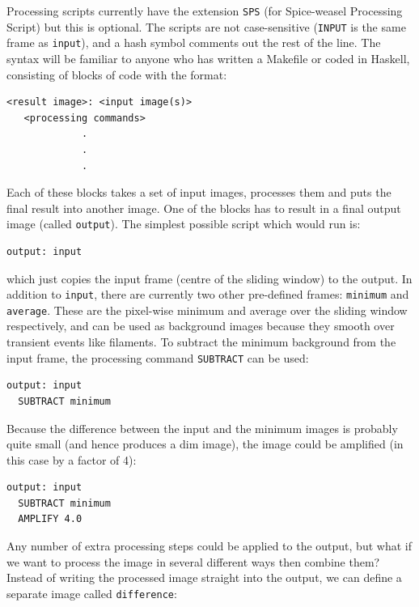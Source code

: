 \documentclass[12pt, a4paper]{article}
\begin{document}
Processing scripts currently have the extension \texttt{SPS} (for Spice-weasel Processing
Script) but this is optional. The scripts are not case-sensitive (\texttt{INPUT}
is the same frame as \texttt{input}), and a hash symbol comments out the rest of the line.
The syntax will be familiar to anyone who has written a Makefile
or coded in Haskell, consisting of blocks of code with the format:

\begin{verbatim}
<result image>: <input image(s)>
   <processing commands>
             .
             .
             .
\end{verbatim} 

\noindent Each of these blocks takes a set of input images, processes them and 
puts the final result into another image.
One of the blocks has to result in a final output image (called \texttt{output}).
The simplest possible script which would run is:

\begin{verbatim}
output: input
\end{verbatim}

\noindent which just copies the input frame (centre of the sliding window) to the output.
In addition to \texttt{input}, there are currently two other pre-defined frames:
\texttt{minimum} and \texttt{average}. These are the pixel-wise minimum and average over the
sliding window respectively, and can be used as background images because they smooth
over transient events like filaments.
To subtract the minimum background from the input frame, the processing command
\texttt{SUBTRACT} can be used:

\begin{verbatim}
output: input
  SUBTRACT minimum
\end{verbatim}

\noindent Because the difference between the input and the minimum images
is probably quite small (and hence produces a dim image),
the image could be amplified (in this case by a factor of 4):

\begin{verbatim}
output: input
  SUBTRACT minimum
  AMPLIFY 4.0
\end{verbatim}

Any number of extra processing steps could be applied to the output, but what if we want to process
the image in several different ways then combine them? Instead of writing the processed image
straight into the output, we can define a separate image called \texttt{difference}:
\end{document}
